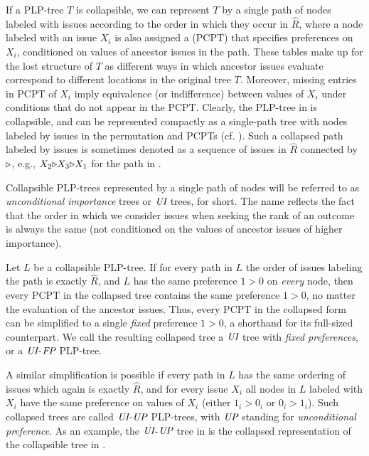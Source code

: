 If a PLP-tree $T$ is collapsible, we can represent $T$ by a single path
of nodes labeled with issues according to the order in which they occur
in $\hat{R}$, 
where a node labeled with an issue $X_i$ is also assigned a
 (PCPT) that specifies 
preferences on $X_i$, conditioned on values of ancestor issues in the path.
These tables make up for the lost structure of $T$ as different ways in 
which ancestor issues evaluate correspond to different locations
in the original tree $T$. 
Moreover, missing entries in PCPT of $X_i$ imply equivalence (or indifference) between values of $X_i$
under conditions that do not appear in the PCPT.
Clearly, the PLP-tree in  is collapsible, and can
be represented compactly as a single-path tree with nodes labeled by 
issues in the permutation and PCPTs (cf. ).
Such a collapsed path labeled by issues is sometimes denoted as
a sequence of issues in $\hat{R}$ connected by $\mathit{\triangleright}$, e.g.,
$X_2\mathit{\triangleright} X_3\mathit{\triangleright} X_1$ for the path in .

Collapsible PLP-trees represented by a single path of nodes 
will be referred to as \emph{unconditional importance} trees or $\textit{UI}$ 
trees, for short. The name reflects the fact that the order in which 
we consider issues when seeking the rank of an outcome is always the 
same (not conditioned on the values of ancestor issues of higher importance).

Let $L$ be a collapsible PLP-tree.
If for every path in $L$ the order of issues labeling the path is exactly $\hat{R}$,
and $L$ has the same preference $1>0$ on \emph{every} node,
then every PCPT in the collapsed tree contains the same preference $1>0$,
no matter the evaluation of the ancestor issues.
Thus, every PCPT in the collapsed form can be simplified to a single \emph{fixed} preference $1>0$,
a shorthand for its full-sized counterpart.
We call the resulting
collapsed tree a $\textit{UI}$ tree with \emph{fixed preferences}, or a $\textit{UI}$-$\textit{FP}$ PLP-tree.

A similar simplification is possible if every path in $L$ has the same ordering of issues
which again is exactly $\hat{R}$, and
for every issue $X_i$ all nodes in $L$ labeled with $X_i$ have the same
preference on values of $X_i$ (either $1_i>0_i$ or $0_i>1_i$).
Such collapsed 
trees are called $\textit{UI}$-$\textit{UP}$ PLP-trees, with $\textit{UP}$ standing for \emph{unconditional 
preference}. As an example, the $\textit{UI}$-$\textit{UP}$ tree in 
is the collapsed representation of the collapsible tree in .

